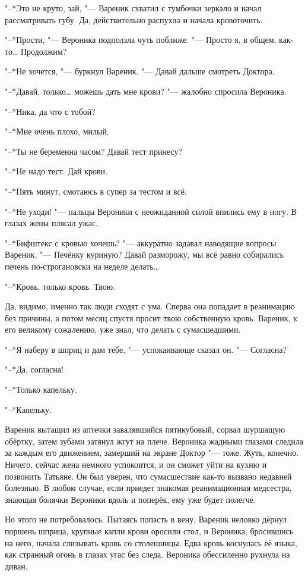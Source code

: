 "--*Это не круто, зай, "--- Вареник схватил с тумбочки зеркало и начал рассматривать губу.
Да, действительно распухла и начала кровоточить.

"--*Прости, "--- Вероника подползла чуть поближе.
"--- Просто я, в общем, как-то\ldots{}
Продолжим?

"--*Не хочется, "--- буркнул Вареник.
"--- Давай дальше смотреть Доктора.

"--*Давай, только\ldots{} можешь дать мне крови? "--- жалобно спросила Вероника.

"--*Ника, да что с тобой?

"--*Мне очень плохо, милый.

"--*Ты не беременна часом?
Давай тест принесу?

"--*Не надо тест.
Дай крови.

"--*Пять минут, смотаюсь в супер за тестом и всё.

"--*Не уходи! "--- пальцы Вероники с неожиданной силой впились ему в ногу.
В глазах жены плясал ужас.

"--*Бифштекс с кровью хочешь? "--- аккуратно задавал наводящие вопросы Вареник.
"--- Печёнку куриную?
Давай разморожу, мы всё равно собирались печень по-строгановски на неделе делать\ldots{}

"--*Кровь, только кровь.
Твою.

Да, видимо, именно так люди сходят с ума.
Сперва она попадает в реанимацию без причины, а потом месяц спустя просит твою собственную кровь.
Вареник, к его великому сожалению, уже знал, что делать с сумасшедшими.

"--*Я наберу в шприц и дам тебе, "--- успокаивающе сказал он.
"--- Согласна?

"--*Да, согласна!

"--*Только капельку.

"--*Капельку.

Вареник вытащил из аптечки завалявшийся пятикубовый, сорвал шуршащую обёртку, затем зубами затянул жгут на плече.
Вероника жадными глазами следила за каждым его движением, замерший на экране Доктор "--- тоже.
Жуть, конечно.
Ничего, сейчас жена немного успокоится, и он сможет уйти на кухню и позвонить Татьяне.
Он был уверен, что сумасшествие как-то вызвано недавней болезнью.
В любом случае, если приедет знакомая реанимационная медсестра, знающая болячки Вероники вдоль и поперёк, ему уже будет полегче.

Но этого не потребовалось.
Пытаясь попасть в вену, Вареник неловко дёрнул поршень шприца, крупные капли крови оросили стол, и Вероника, бросившись на него, начала слизывать кровь со столешницы.
Едва кровь коснулась её языка, как странный огонь в глазах угас без следа.
Вероника обессиленно рухнула на диван.

